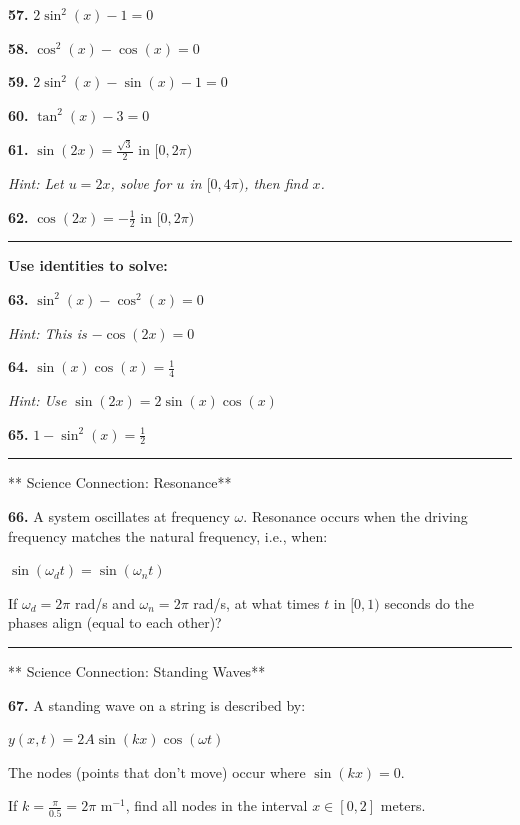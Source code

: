 \documentclass[
  11pt,
]{article}
\begin{document}
\textbf{57.} \(2\sin^2(x) - 1 = 0\)

\textbf{58.} \(\cos^2(x) - \cos(x) = 0\)

\textbf{59.} \(2\sin^2(x) - \sin(x) - 1 = 0\)

\textbf{60.} \(\tan^2(x) - 3 = 0\)

\textbf{61.} \(\sin(2x) = \frac{\sqrt{3}}{2}\) in \([0, 2\pi)\)

\emph{Hint: Let \(u = 2x\), solve for \(u\) in \([0, 4\pi)\), then find
\(x\).}

\textbf{62.} \(\cos(2x) = -\frac{1}{2}\) in \([0, 2\pi)\)

\begin{center}\rule{0.5\linewidth}{0.5pt}\end{center}

\textbf{Use identities to solve:}

\textbf{63.} \(\sin^2(x) - \cos^2(x) = 0\)

\emph{Hint: This is \(-\cos(2x) = 0\)}

\textbf{64.} \(\sin(x)\cos(x) = \frac{1}{4}\)

\emph{Hint: Use \(\sin(2x) = 2\sin(x)\cos(x)\)}

\textbf{65.} \(1 - \sin^2(x) = \frac{1}{2}\)

\begin{center}\rule{0.5\linewidth}{0.5pt}\end{center}

** Science Connection: Resonance**

\textbf{66.} A system oscillates at frequency \(\omega\). Resonance
occurs when the driving frequency matches the natural frequency, i.e.,
when:

\(\sin(\omega_d t) = \sin(\omega_n t)\)

If \(\omega_d = 2\pi\) rad/s and \(\omega_n = 2\pi\) rad/s, at what
times \(t\) in \([0, 1)\) seconds do the phases align (equal to each
other)?

\begin{center}\rule{0.5\linewidth}{0.5pt}\end{center}

** Science Connection: Standing Waves**

\textbf{67.} A standing wave on a string is described by:

\(y(x,t) = 2A\sin(kx)\cos(\omega t)\)

The nodes (points that don't move) occur where \(\sin(kx) = 0\).

If \(k = \frac{\pi}{0.5} = 2\pi\) m\(^{-1}\), find all nodes in the
interval \(x \in [0, 2]\) meters.
\end{document}
